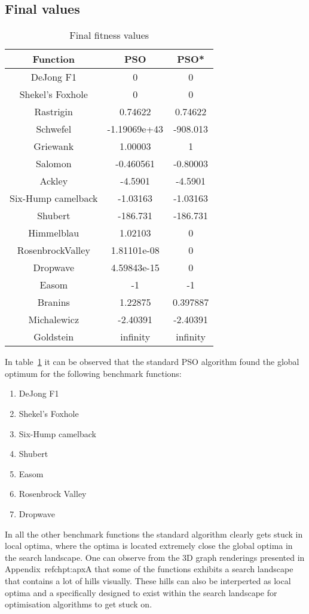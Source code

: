 \subsection{Final values}
\begin{table}[h]
\label{tbl:fitnessValues}
\begin{center}
	\begin{tabular}{| c | c | c |}
	\hline
	Function & PSO & PSO*\\  \hline
	DeJong F1 & 0 & 0 \\ \hline
	Shekel's Foxhole & 0 & 0 \\ \hline
	Rastrigin & 0.74622  & 0.74622\\ \hline
	Schwefel & -1.19069e+43  & -908.013\\ \hline
	Griewank & 1.00003 & 1 \\ \hline
	Salomon & -0.460561 & -0.80003 \\ \hline
	Ackley & -4.5901 & -4.5901 \\ \hline
	Six-Hump camelback & -1.03163 & -1.03163 \\ \hline
	Shubert & -186.731 & -186.731 \\ \hline
	Himmelblau & 1.02103 & 0 \\ \hline
	RosenbrockValley & 1.81101e-08 & 0 \\ \hline
	Dropwave & 4.59843e-15 & 0 \\ \hline
	Easom & -1 & -1 \\ \hline
	Branins & 1.22875 & 0.397887 \\ \hline
	Michalewicz & -2.40391 & -2.40391 \\ \hline
	Goldstein & infinity  & infinity\\ \hline
	\end{tabular}
\end{center}
\caption{Final fitness values}
\end{table}
In table~\ref{tbl:fitnessValues} it can be observed that the standard PSO algorithm found the global optimum for the following benchmark functions:
\begin{enumerate}
\item DeJong F1 
\item Shekel's Foxhole
\item Six-Hump camelback
\item Shubert
\item Easom
\item Rosenbrock Valley
\item Dropwave
\end{enumerate}
In all the other benchmark functions the standard algorithm clearly gets stuck in local optima, where the optima is located extremely close the global optima in the search landscape. One can observe from the 3D graph renderings presented in Appendix~ref{chpt:apxA} that some of the functions exhibits a search landscape that contains a lot of hills visually. These hills can also be interperted as local optima and a specifically designed to exist within the search landscape for optimisation algorithms to get stuck on.

